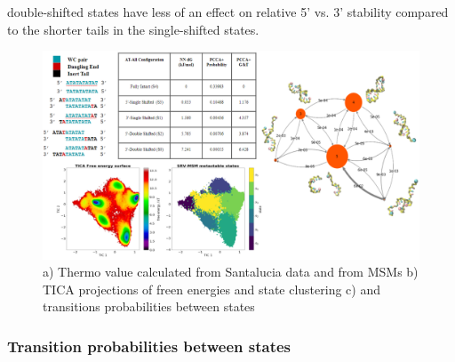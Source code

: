 \documentclass[journal=jpcbfk,manuscript=article]{achemso}
\begin{document}
double-shifted states have less of an effect on relative 5' vs. 3' stability compared to the shorter tails in the single-shifted states.

\begin{figure}[ht!]
	\begin{center}
        \includegraphics[width=\textwidth]{Figs/figs_0804/AT-all_in_one.PNG}
        \caption{a) Thermo value calculated from Santalucia data and from MSMs b) TICA projections of freen energies and state clustering c) and transitions probabilities between states}
        \label{fig:AT-all_in_one}
	\end{center}
\end{figure}

\subsubsection{\label{sec:Results}Transition probabilities between states}
\end{document}
